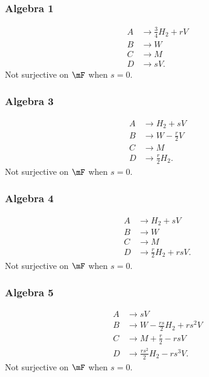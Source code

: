 \subsubsection{Algebra 1}

\begin{align*}
	A & \to \frac{ 3 }{4}H_{2}+rV \\
	B & \to W                     \\
	C & \to M                     \\
	D & \to sV.
\end{align*}
Not surjective on $\mF$ when $s=0$.

\subsubsection{Algebra 3}

\begin{align*}
	A & \to H_{2}+sV              \\
	B & \to W-\frac{ r }{ 2 }V    \\
	C & \to M                     \\
	D & \to \frac{ r }{ 2 }H_{2}.
\end{align*}
Not surjective on $\mF$ when $s=0$.

\subsubsection{Algebra 4}

\begin{align*}
	A & \to H_{2}+sV                  \\
	B & \to W                         \\
	C & \to M                         \\
	D & \to \frac{ r }{ 2 }H_{2}+rsV.
\end{align*}
Not surjective on $\mF$ when $s=0$.

\subsubsection{Algebra 5}

\begin{align*}
	A & \to sV                                 \\
	B & \to W-\frac{ rs }{ 2 }H_{2}+rs^{2}V    \\
	C & \to M+\frac{ r }{2}-rsV                \\
	D & \to \frac{ rs^{2} }{ 2 }H_{2}-rs^{3}V.
\end{align*}
Not surjective on $\mF$ when $s=0$.

